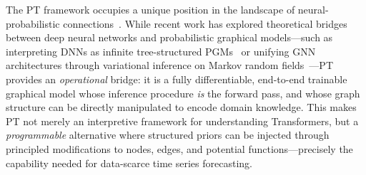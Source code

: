 The PT framework occupies a unique position in the landscape of neural-probabilistic connections~\citep{keuper2024neural, zheng2023deep}. While recent work has explored theoretical bridges between deep neural networks and probabilistic graphical models---such as interpreting DNNs as infinite tree-structured PGMs~\citep{li2024neural} or unifying GNN architectures through variational inference on Markov random fields~\citep{chen2023unifying}---PT provides an \emph{operational} bridge: it is a fully differentiable, end-to-end trainable graphical model whose inference procedure \emph{is} the forward pass, and whose graph structure can be directly manipulated to encode domain knowledge. This makes PT not merely an interpretive framework for understanding Transformers, but a \emph{programmable} alternative where structured priors can be injected through principled modifications to nodes, edges, and potential functions---precisely the capability needed for data-scarce time series forecasting.



% 

